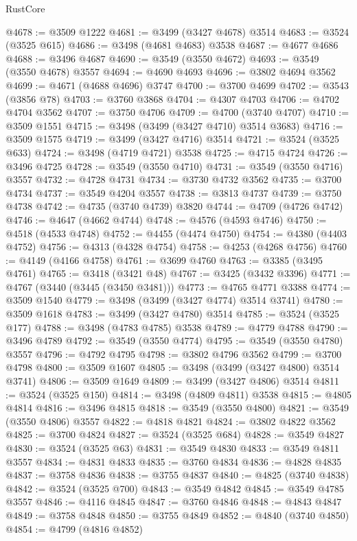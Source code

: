 \begin{lexlean}{RustCore}
\begin{coremodule}
@4678 := @3509 @1222
@4681 := @3499 (@3427 @4678) @3514
@4683 := @3524 (@3525 @615)
@4686 := @3498 (@4681 @4683) @3538
@4687 := @4677 @4686
@4688 := @3496 @4687
@4690 := @3549 (@3550 @4672)
@4693 := @3549 (@3550 @4678) @3557
@4694 := @4690 @4693
@4696 := @3802 @4694 @3562
@4699 := @4671 (@4688 @4696) @3747
@4700 := @3700 @4699
@4702 := @3543 (@3856 @78)
@4703 := @3760 @3868
@4704 := @4307 @4703
@4706 := @4702 @4704 @3562
@4707 := @3750 @4706
@4709 := @4700 (@3740 @4707)
@4710 := @3509 @1551
@4715 := @3498 (@3499 (@3427 @4710) @3514 @3683)
@4716 := @3509 @1575
@4719 := @3499 (@3427 @4716) @3514
@4721 := @3524 (@3525 @633)
@4724 := @3498 (@4719 @4721) @3538
@4725 := @4715 @4724
@4726 := @3496 @4725
@4728 := @3549 (@3550 @4710)
@4731 := @3549 (@3550 @4716) @3557
@4732 := @4728 @4731
@4734 := @3730 @4732 @3562
@4735 := @3700 @4734
@4737 := @3549 @4204 @3557
@4738 := @3813 @4737
@4739 := @3750 @4738
@4742 := @4735 (@3740 @4739) @3820
@4744 := @4709 (@4726 @4742)
@4746 := @4647 (@4662 @4744)
@4748 := @4576 (@4593 @4746)
@4750 := @4518 (@4533 @4748)
@4752 := @4455 (@4474 @4750)
@4754 := @4380 (@4403 @4752)
@4756 := @4313 (@4328 @4754)
@4758 := @4253 (@4268 @4756)
@4760 := @4149 (@4166 @4758)
@4761 := @3699 @4760
@4763 := @3385 (@3495 @4761)
@4765 := @3418 (@3421 @48)
@4767 := @3425 (@3432 @3396)
@4771 := @4767 (@3440 (@3445 (@3450 @3481)))
@4773 := @4765 @4771 @3388
@4774 := @3509 @1540
@4779 := @3498 (@3499 (@3427 @4774) @3514 @3741)
@4780 := @3509 @1618
@4783 := @3499 (@3427 @4780) @3514
@4785 := @3524 (@3525 @177)
@4788 := @3498 (@4783 @4785) @3538
@4789 := @4779 @4788
@4790 := @3496 @4789
@4792 := @3549 (@3550 @4774)
@4795 := @3549 (@3550 @4780) @3557
@4796 := @4792 @4795
@4798 := @3802 @4796 @3562
@4799 := @3700 @4798
@4800 := @3509 @1607
@4805 := @3498 (@3499 (@3427 @4800) @3514 @3741)
@4806 := @3509 @1649
@4809 := @3499 (@3427 @4806) @3514
@4811 := @3524 (@3525 @150)
@4814 := @3498 (@4809 @4811) @3538
@4815 := @4805 @4814
@4816 := @3496 @4815
@4818 := @3549 (@3550 @4800)
@4821 := @3549 (@3550 @4806) @3557
@4822 := @4818 @4821
@4824 := @3802 @4822 @3562
@4825 := @3700 @4824
@4827 := @3524 (@3525 @684)
@4828 := @3549 @4827
@4830 := @3524 (@3525 @63)
@4831 := @3549 @4830
@4833 := @3549 @4811 @3557
@4834 := @4831 @4833
@4835 := @3760 @4834
@4836 := @4828 @4835
@4837 := @3758 @4836
@4838 := @3755 @4837
@4840 := @4825 (@3740 @4838)
@4842 := @3524 (@3525 @700)
@4843 := @3549 @4842
@4845 := @3549 @4785 @3557
@4846 := @4116 @4845
@4847 := @3760 @4846
@4848 := @4843 @4847
@4849 := @3758 @4848
@4850 := @3755 @4849
@4852 := @4840 (@3740 @4850)
@4854 := @4799 (@4816 @4852)

\end{coremodule}
\end{lexlean}
